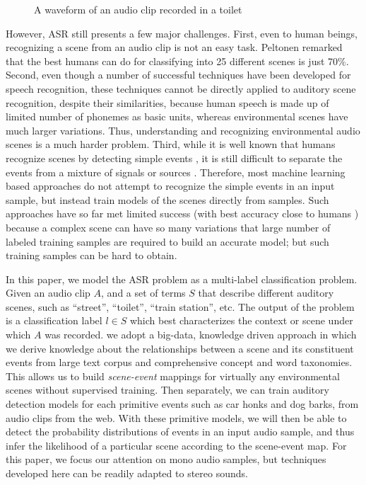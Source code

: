 \begin{figure}[th]
\centering
{}
\caption{A waveform of an audio clip recorded in a toilet}
\label{fig:exa}
\end{figure}
However, ASR still presents a few major challenges. First, even to human beings,
recognizing a scene from an audio clip is not an easy task. Peltonen \et\cite{peltonen2001recognition} remarked that the best humans can do 
for classifying into 25 different scenes is just 70\%. 
Second, even though a number of successful techniques have been developed
for speech recognition, these techniques cannot be directly applied to
auditory scene recognition, despite their similarities, 
because human speech is made up of limited number of phonemes as basic units, 
whereas environmental scenes have much larger variations. 
Thus, understanding and recognizing environmental audio scenes
is a much harder problem.
Third, while it is well known that humans
recognize scenes by detecting simple events 
\cite{peltonen2001recognition,heittola2010audio}, 
it is still difficult to separate the events from a mixture of 
signals or sources 
\cite{comon2010handbook}. Therefore,
most machine learning based approaches do not attempt to recognize the simple
events in an input sample, but instead train models of the scenes directly
from samples. Such approaches have so far met limited success (with best accuracy close to humans \cite{1561288}) because a complex scene can have so many variations
that large number of labeled training samples are required to build 
an accurate model; but such training samples can be hard to obtain.

In this paper, we model the ASR problem as a multi-label classification
problem. Given an audio clip $A$, and a set of terms $S$
that describe different auditory scenes, such as ``street'', ``toilet'',
``train station'', etc. The output of the problem is a classification
label $l \in S$ which best characterizes the context or scene
under which $A$ was recorded. 
we adopt a big-data, knowledge driven approach in which
we derive knowledge about the relationships between a scene and its
constituent events from large text corpus and comprehensive concept and
word taxonomies. This allows us to build {\em scene-event} mappings 
for virtually any environmental scenes without supervised training.
Then separately, we can train auditory detection models for each
primitive events such as car honks and dog barks, from audio clips from
the web. With these primitive models, we will then be able to detect
the probability distributions of events in an input audio sample, and 
thus infer the likelihood of a particular scene according to the
scene-event map. For this paper, we focus our attention on mono audio samples,
but techniques developed here can be readily adapted to stereo sounds.

